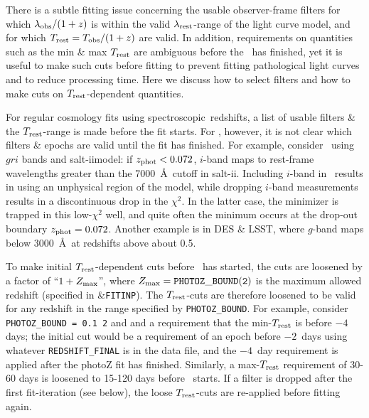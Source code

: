 \documentclass[12pt]{article}
\newcommand{\Tobs}{T_{\rm obs}}
\newcommand{\Trest}{T_{\rm rest}}
\newcommand{\SALTII}{{\sc salt-ii}}
\newcommand{\Zphot}{z_{\rm phot}}
\newcommand{\spec}{spectroscopic}
\newcommand{\lamobs}{\lambda_{\rm obs}}
\newcommand{\lamrest}{\lambda_{\rm rest}}
\newcommand{\zmax}{Z_{\rm max}}
\begin{document}
There is a subtle fitting issue concerning the usable
observer-frame filters for which $\lamobs/(1+z)$ is within 
the valid $\lamrest$-range of the light curve model,
and for which $\Trest = \Tobs/(1+z)$ are valid.
In addition, requirements on quantities such as
the min \& max $\Trest$ are ambiguous before the 
\lcfitz\ has finished, yet it is useful
to make such cuts before fitting to prevent fitting
pathological light curves and to reduce processing time. 
Here we discuss how to select filters and how to make cuts 
on $\Trest$-dependent quantities.


For regular cosmology fits using \spec\ redshifts,
a list of usable filters \& the $\Trest$-range 
is made before the fit starts. 
For \lcfitz, however, it is not clear which filters \& epochs
are valid until the fit has finished. 
For example, consider \lcfitz\ using  $gri$ bands and \SALTII model: 
if $\Zphot < 0.072$, $i$-band maps to rest-frame wavelengths 
greater than the 7000~\AA\ cutoff in \SALTII. Including $i$-band
in \lcfitz\ results in using an unphysical region of the model,
while dropping $i$-band measurements results in a discontinuous
drop in the $\chi^2$. In the latter case, the minimizer is trapped
in this low-$\chi^2$ well, and quite often the minimum occurs
at the drop-out boundary $\Zphot = 0.072$.
Another example is in DES \& LSST, where $g$-band maps below 3000~\AA\
at redshifts above about 0.5.


To make initial $\Trest$-dependent cuts before \lcfitz\
has started, the cuts are loosened by a factor of
``$1+\zmax$'', where $\zmax= {\tt PHOTOZ\_BOUND(2)}$ is
the maximum allowed redshift (specified in \&{\tt FITINP}).
The $\Trest$-cuts are therefore loosened to be valid
for any redshift in the range specified by \verb|PHOTOZ_BOUND|.
For example, consider \verb|PHOTOZ_BOUND = 0.1 2| and 
and a requirement that the min-$\Trest$ is before $-4$ days;
the initial cut would be a requirement of an epoch before
$-2$~days using whatever \verb|REDSHIFT_FINAL| is in the 
data file, and the $-4$~day requirement is applied after
the photoZ fit has finished.
Similarly, a max-$\Trest$ requirement of 30-60 days is loosened 
to 15-120 days before \lcfitz\ starts.
If a filter is dropped after the first fit-iteration (see below), 
the loose $\Trest$-cuts are re-applied before fitting again.
\end{document}
